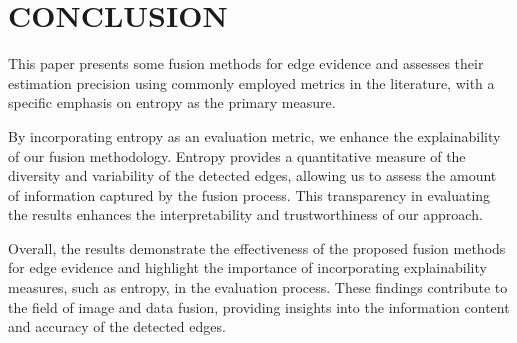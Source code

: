 \documentclass{article}
\begin{document}
\section{CONCLUSION}
\vspace{-0.3cm}
This paper presents some fusion methods for edge evidence and assesses their estimation precision using commonly employed metrics in the literature, with a specific emphasis on entropy as the primary measure.

By incorporating entropy as an evaluation metric, we enhance the explainability of our fusion methodology. Entropy provides a quantitative measure of the diversity and variability of the detected edges, allowing us to assess the amount of information captured by the fusion process. This transparency in evaluating the results enhances the interpretability and trustworthiness of our approach.

Overall, the results demonstrate the effectiveness of the proposed fusion methods for edge evidence and highlight the importance of incorporating explainability measures, such as entropy, in the evaluation process. These findings contribute to the field of image and data fusion, providing insights into the information content and accuracy of the detected edges.


%
%

%


\end{document}
